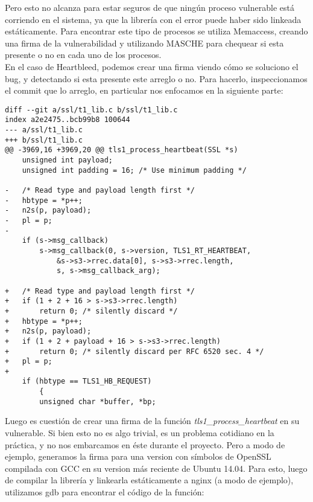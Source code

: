 Pero esto no alcanza para estar seguros de que ningún proceso vulnerable está
corriendo en el sistema, ya que la librería con el error puede haber sido
linkeada estáticamente. Para encontrar este tipo de procesos se utiliza
Memaccess, creando una firma de la vulnerabilidad y utilizando MASCHE para
chequear si esta presente o no en cada uno de los procesos.\\

En el caso de Heartbleed, podemos crear una firma viendo cómo se soluciono el
bug, y detectando si esta presente este arreglo o no. Para hacerlo,
inspeccionamos el commit que lo arreglo, en particular nos enfocamos en la
siguiente parte:

\begin{lstlisting}
diff --git a/ssl/t1_lib.c b/ssl/t1_lib.c
index a2e2475..bcb99b8 100644
--- a/ssl/t1_lib.c
+++ b/ssl/t1_lib.c
@@ -3969,16 +3969,20 @@ tls1_process_heartbeat(SSL *s)
 	unsigned int payload;
 	unsigned int padding = 16; /* Use minimum padding */

-	/* Read type and payload length first */
-	hbtype = *p++;
-	n2s(p, payload);
-	pl = p;
-
 	if (s->msg_callback)
 		s->msg_callback(0, s->version, TLS1_RT_HEARTBEAT,
 			&s->s3->rrec.data[0], s->s3->rrec.length,
 			s, s->msg_callback_arg);

+	/* Read type and payload length first */
+	if (1 + 2 + 16 > s->s3->rrec.length)
+		return 0; /* silently discard */
+	hbtype = *p++;
+	n2s(p, payload);
+	if (1 + 2 + payload + 16 > s->s3->rrec.length)
+		return 0; /* silently discard per RFC 6520 sec. 4 */
+	pl = p;
+
 	if (hbtype == TLS1_HB_REQUEST)
 		{
 		unsigned char *buffer, *bp;
\end{lstlisting}

Luego es cuestión de crear una firma de la función
\textit{tls1\_process\_heartbeat} en su vulnerable. Si bien esto no es algo
trivial, es un problema cotidiano en la práctica, y no nos embarcamos en éste
durante el proyecto. Pero a modo de ejemplo, generamos la firma para una
version con símbolos de OpenSSL compilada con GCC en su version más reciente de
Ubuntu 14.04. Para esto, luego de compilar la librería y linkearla
estáticamente a nginx (a modo de ejemplo), utilizamos gdb para encontrar el
código de la función:

